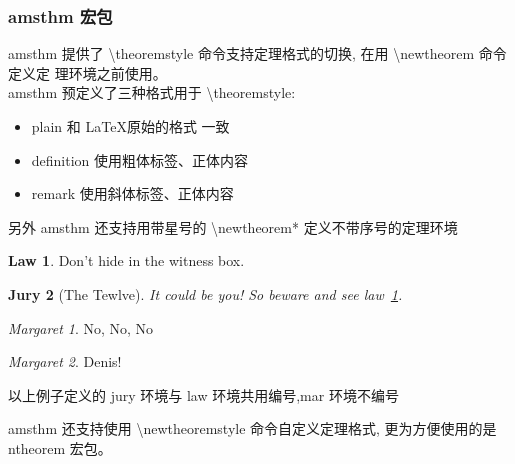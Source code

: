 \documentclass[a4paper]{ctexart}
\begin{document}
    \subsubsection{amsthm 宏包}
    amsthm 提供了 \textbackslash theoremstyle 命令支持定理格式的切换,%
    在用 \textbackslash newtheorem 命令定义定 理环境之前使用。\\
    amsthm 预定义了三种格式用于 \textbackslash theoremstyle:
    \begin{itemize}
        \item plain 和 \LaTeX 原始的格式 一致
        \item definition 使用粗体标签、正体内容
        \item remark 使用斜体标签、正体内容
    \end{itemize}
    另外 amsthm 还支持用带星号的 \textbackslash newtheorem* 定义不带序号的定理环境\par
    \theoremstyle{definition} \newtheorem{law}{Law}
    \theoremstyle{plain} \newtheorem{jury}[law]{Jury}
    \theoremstyle{remark} \newtheorem*{mar}{Margaret}
    \begin{law}\label{law:box}
        Don't hide in the witness box.
    \end{law}
    \begin{jury}[The Tewlve]
        It could be you! So beware and see law~\ref{law:box}.
    \end{jury}
    \begin{mar}
        No, No, No
    \end{mar}
    \begin{mar}
        Denis!
    \end{mar}
    以上例子定义的 jury 环境与 law 环境共用编号,mar 环境不编号\par
    amsthm 还支持使用 \textbackslash newtheoremstyle 命令自定义定理格式,%
    更为方便使用的是 ntheorem 宏包。
\end{document}

